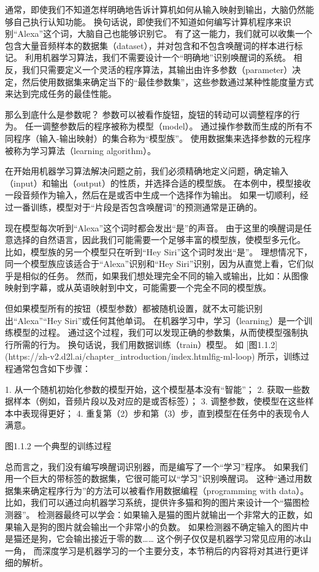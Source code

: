 通常，即使我们不知道怎样明确地告诉计算机如何从输入映射到输出，大脑仍然能够自己执行认知功能。 换句话说，即使我们不知道如何编写计算机程序来识别“Alexa”这个词，大脑自己也能够识别它。 有了这一能力，我们就可以收集一个包含大量音频样本的数据集（dataset），并对包含和不包含唤醒词的样本进行标记。 利用机器学习算法，我们不需要设计一个“明确地”识别唤醒词的系统。 相反，我们只需要定义一个灵活的程序算法，其输出由许多参数（parameter）决定，然后使用数据集来确定当下的“最佳参数集”，这些参数通过某种性能度量方式来达到完成任务的最佳性能。

那么到底什么是参数呢？ 参数可以被看作旋钮，旋钮的转动可以调整程序的行为。 任一调整参数后的程序被称为模型（model）。 通过操作参数而生成的所有不同程序（输入-输出映射）的集合称为“模型族”。 使用数据集来选择参数的元程序被称为学习算法（learning algorithm）。

在开始用机器学习算法解决问题之前，我们必须精确地定义问题，确定输入（input）和输出（output）的性质，并选择合适的模型族。 在本例中，模型接收一段音频作为输入，然后在是或否中生成一个选择作为输出。 如果一切顺利，经过一番训练，模型对于“片段是否包含唤醒词”的预测通常是正确的。

现在模型每次听到“Alexa”这个词时都会发出“是”的声音。 由于这里的唤醒词是任意选择的自然语言，因此我们可能需要一个足够丰富的模型族，使模型多元化。 比如，模型族的另一个模型只在听到“Hey Siri”这个词时发出“是”。 理想情况下，同一个模型族应该适合于“Alexa”识别和“Hey Siri”识别，因为从直觉上看，它们似乎是相似的任务。 然而，如果我们想处理完全不同的输入或输出，比如：从图像映射到字幕，或从英语映射到中文，可能需要一个完全不同的模型族。

但如果模型所有的按钮（模型参数）都被随机设置，就不太可能识别出“Alexa”“Hey Siri”或任何其他单词。 在机器学习中，学习（learning）是一个训练模型的过程。 通过这个过程，我们可以发现正确的参数集，从而使模型强制执行所需的行为。 换句话说，我们用数据训练（train）模型。 如 [图1.1.2]
(https://zh-v2.d2l.ai/chapter\_introduction/index.htmlfig-ml-loop)
所示，训练过程通常包含如下步骤：

1. 从一个随机初始化参数的模型开始，这个模型基本没有“智能”；
2. 获取一些数据样本（例如，音频片段以及对应的是或否标签）；
3. 调整参数，使模型在这些样本中表现得更好；
4. 重复第（2）步和第（3）步，直到模型在任务中的表现令人满意。


图1.1.2 一个典型的训练过程

总而言之，我们没有编写唤醒词识别器，而是编写了一个“学习”程序。 如果我们用一个巨大的带标签的数据集，它很可能可以“学习”识别唤醒词。 这种“通过用数据集来确定程序行为”的方法可以被看作用数据编程（programming with data）。 比如，我们可以通过向机器学习系统，提供许多猫和狗的图片来设计一个“猫图检测器”。 检测器最终可以学会：如果输入是猫的图片就输出一个非常大的正数，如果输入是狗的图片就会输出一个非常小的负数。 如果检测器不确定输入的图片中是猫还是狗，它会输出接近于零的数…… 这个例子仅仅是机器学习常见应用的冰山一角， 而深度学习是机器学习的一个主要分支，本节稍后的内容将对其进行更详细的解析。

